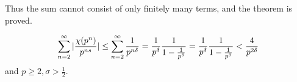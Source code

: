 Thus the sum cannot consist of only finitely many terms, and the theorem is proved.





\[ 
    \sum_{n=2}^\infty |\frac{\chi(p^n)}{p^{ns}}| \leq \sum_{n=2}^\infty \frac{1}{p^{n\delta}} = \frac{1}{p^{\delta}} \frac{1}{1 - \frac{1}{p^{\delta}}} \\
    = \frac{1}{p^{\delta}} \frac{1}{1 - \frac{1}{p^{\delta}}} < \frac{4}{p^{2\delta}}
\]
and \( p \geq 2, \sigma > \frac{1}{2} \).

